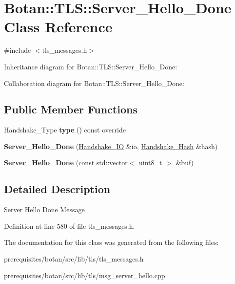 \hypertarget{class_botan_1_1_t_l_s_1_1_server___hello___done}{}\section{Botan\+:\+:T\+LS\+:\+:Server\+\_\+\+Hello\+\_\+\+Done Class Reference}
\label{class_botan_1_1_t_l_s_1_1_server___hello___done}


{\ttfamily \#include $<$tls\+\_\+messages.\+h$>$}



Inheritance diagram for Botan\+:\+:T\+LS\+:\+:Server\+\_\+\+Hello\+\_\+\+Done\+:


Collaboration diagram for Botan\+:\+:T\+LS\+:\+:Server\+\_\+\+Hello\+\_\+\+Done\+:
\subsection*{Public Member Functions}
\begin{DoxyCompactItemize}
\item 
\mbox{\label{class_botan_1_1_t_l_s_1_1_server___hello___done_a9e19242670ce54f66d015beff66b8aec}} 
Handshake\+\_\+\+Type {\bfseries type} () const override
\item 
\mbox{\label{class_botan_1_1_t_l_s_1_1_server___hello___done_afe86cca5a2e6aa673a3a60b3e82ca505}} 
{\bfseries Server\+\_\+\+Hello\+\_\+\+Done} (\mbox{\hyperlink{class_botan_1_1_t_l_s_1_1_handshake___i_o}{Handshake\+\_\+\+IO}} \&io, \mbox{\hyperlink{class_botan_1_1_t_l_s_1_1_handshake___hash}{Handshake\+\_\+\+Hash}} \&hash)
\item 
\mbox{\label{class_botan_1_1_t_l_s_1_1_server___hello___done_a5c4e97e6f3131bce3ff6ac2e12a44af2}} 
{\bfseries Server\+\_\+\+Hello\+\_\+\+Done} (const std\+::vector$<$ uint8\+\_\+t $>$ \&buf)
\end{DoxyCompactItemize}


\subsection{Detailed Description}
Server Hello Done Message 

Definition at line 580 of file tls\+\_\+messages.\+h.



The documentation for this class was generated from the following files\+:\begin{DoxyCompactItemize}
\item 
prerequisites/botan/src/lib/tls/tls\+\_\+messages.\+h\item 
prerequisites/botan/src/lib/tls/msg\+\_\+server\+\_\+hello.\+cpp\end{DoxyCompactItemize}
